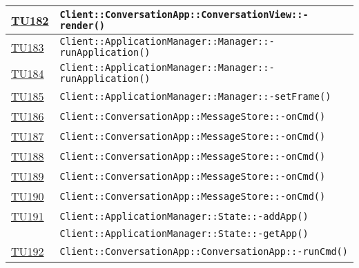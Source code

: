 \begin{longtable}{|>{\centering}m{1cm}|m{12cm}<{\centering}|}
\hyperlink{TU182}{TU182} & \texttt{Client::ConversationApp::ConversationView::-\linebreak render()}\\ \hline

\hyperlink{TU183}{TU183} & \texttt{Client::ApplicationManager::Manager::-\linebreak runApplication()}\\ \hline

\hyperlink{TU184}{TU184} & \texttt{Client::ApplicationManager::Manager::-\linebreak runApplication()}\\ \hline

\hyperlink{TU185}{TU185} & \texttt{Client::ApplicationManager::Manager::-\linebreak setFrame()}\\ \hline

\hyperlink{TU186}{TU186} & \texttt{Client::ConversationApp::MessageStore::-\linebreak onCmd()}\\ \hline

\hyperlink{TU187}{TU187} & \texttt{Client::ConversationApp::MessageStore::-\linebreak onCmd()}\\ \hline

\hyperlink{TU188}{TU188} & \texttt{Client::ConversationApp::MessageStore::-\linebreak onCmd()}\\ \hline

\hyperlink{TU189}{TU189} & \texttt{Client::ConversationApp::MessageStore::-\linebreak onCmd()}\\ \hline

\hyperlink{TU190}{TU190} & \texttt{Client::ConversationApp::MessageStore::-\linebreak onCmd()}\\ \hline

\hyperlink{TU191}{TU191} & \texttt{Client::ApplicationManager::State::-\linebreak addApp()}\\ & \texttt{Client::ApplicationManager::State::-\linebreak getApp()}\\ \hline

\hyperlink{TU192}{TU192} & \texttt{Client::ConversationApp::ConversationApp::-\linebreak runCmd()}\\ \hline


\end{longtable}
